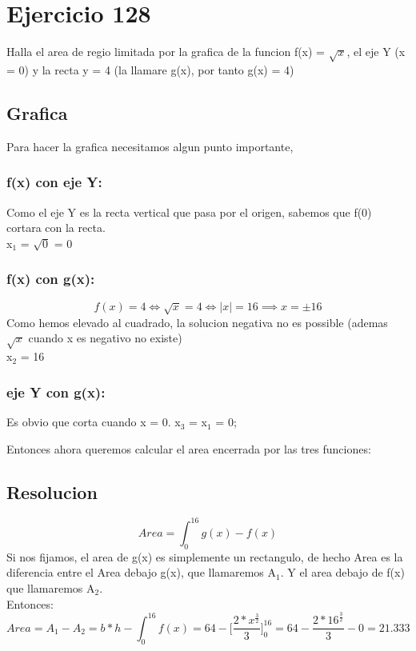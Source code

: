 \documentclass[11pt]{article}
\date{\today}
\title{}
\begin{document}
\section{Ejercicio 128}
\label{sec:org10c8875}
Halla el area de regio limitada por la grafica de la funcion f(x) = \(\sqrt{x}\), el eje Y (x = 0) y la recta y = 4 (la llamare g(x), por tanto g(x) = 4)

\subsection{Grafica}
\label{sec:org0bfa64e}
Para hacer la grafica necesitamos algun punto importante, 
\subsubsection{f(x) con eje Y:}
\label{sec:org9850d85}
Como el eje Y es la recta vertical que pasa por el origen, sabemos que f(0) cortara con la recta. \\
x\(_{\text{1}}\) = \(\sqrt{0}\) = 0
\subsubsection{f(x) con g(x):}
\label{sec:org5eb5d2c}
\[ f(x) = 4 \iff \sqrt{x} = 4 \iff \lvert x \rvert = 16 \implies x = \pm 16 \]
Como hemos elevado al cuadrado, la solucion negativa no es possible (ademas \(\sqrt{x}\) cuando x es negativo no existe) \\
x\(_{\text{2}}\) = 16
\subsubsection{eje Y con g(x):}
\label{sec:orgdebb2e4}
Es obvio que corta cuando x = 0.
x\(_{\text{3}}\) = x\(_{\text{1}}\) = 0;



Entonces ahora queremos calcular el area encerrada por las tres funciones:
\subsection{Resolucion}
\label{sec:org10228ca}
\[ Area = \int_{0}^{16} g(x) - f(x)  \]
Si nos fijamos, el area de g(x) es simplemente un rectangulo, de hecho Area es la diferencia entre el Area debajo g(x), que llamaremos A\(_{\text{1}}\). Y el area debajo de f(x) que llamaremos A\(_{\text{2}}\).\\
Entonces:
\[ Area = A_1 - A_2 = b*h - \int_{0}^{16} f(x) = 64 - \bigg[\frac{2*x^{\frac{3}{2}}}{3}\bigg]_{0}^{16} = 64 - \frac{2*16^{\frac{3}{2}}}{3} - 0 = 21.333\]
\end{document}
